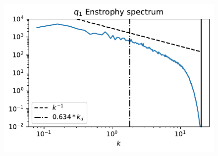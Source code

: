 \begin{figure}
    \centering
    \includegraphics{plot_snap/figs/2Lay_q1spec_t150d00}
    \caption{}
    \label{fig:2Lay_q1spec_t150d00}
\end{figure}